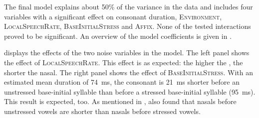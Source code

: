 The final model explains about 50\% of the variance in the data and includes four variables with a significant effect on consonant duration, \textsc{Environment}, \textsc{LocalSpeechRate}, \textsc{BaseInitialStress} and \textsc{Affix}. None of the tested interactions proved to be significant. 
An overview of the model coefficients is given in .%



\begin{table}

	\caption{ Summary of linear model for variables predicting the Box-Cox-transformed duration of [m] in prefixed words}
	\label{tbl: summary model2}
	
	

\end{table}


 displays the effects of the two noise variables in the model. The left panel shows the effect of  \textsc{LocalSpeechRate}. This effect is as expected: 
the higher the , the shorter the nasal. The right panel shows the effect of \textsc{BaseInitialStress}. With an estimated mean duration of 74~ms, the consonant is 21~ms shorter before an unstressed base-initial syllable than before a stressed base-initial syllable (95~ms). This result is expected, too. As mentioned in , \cite{Umeda.1977} also found that nasals before unstressed vowels are shorter than nasals before stressed vowels.

